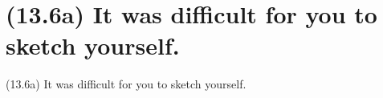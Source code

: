 \documentclass{article}
\begin{document}
\bigbreak
\vbox{}
\bigbreak

\clearpage

%
%

\section*{(13.6a) It was difficult for you to sketch yourself.}

\bigbreak
\begin{enumerate*}
\item[(13.6a)] It was difficult for you to sketch yourself.
\end{enumerate*}
\bigbreak
\end{document}
